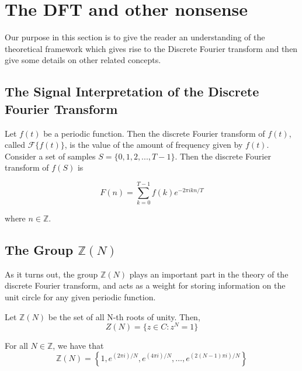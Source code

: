 \documentclass[../article.tex]{subfiles}
\begin{document}
\section{The DFT and other nonsense}
Our purpose in this section is to give the reader an understanding of the theoretical framework which gives rise to the Discrete Fourier transform and then give some details on other related concepts.

\subsection{The Signal Interpretation of the Discrete Fourier Transform}

Let $f(t)$ be a periodic function. Then the discrete Fourier transform of $f(t)$, called $\mathcal{F}\{f(t)\}$, is the value of the amount of frequency given by $f(t)$. Consider a set of samples $S = \{0,1,2,...,T-1\}$. Then the discrete Fourier transform of $f(S)$ is

\[
F(n) = \sum_{k=0}^{T-1} f(k) e^{-2 \pi ikn/T}
\]

where $n \in \mathbb{Z}$.

\subsection{The Group $\mathbb{Z}(N)$}

As it turns out, the group $\mathbb{Z}(N)$ plays an important part in the theory of the discrete Fourier transform, and acts as a weight for storing information on the unit circle for any given periodic function.

\begin{definition}
Let $\mathbb{Z}(N)$ be the set of all N-th roots of unity. Then,
 \[Z(N) = \{z \in C : z^N = 1 \}\]
\end{definition}
\begin{theorem}
For all $N \in \mathbb{Z}$, we have that
\[\mathbb{Z}(N)= \left\{1, e^{(2 \pi i)/N}, e^{(4 \pi i)/N}, \ldots, e^{(2(N-1) \pi i)/N}\right\}\]
\end{theorem}
\end{document}
